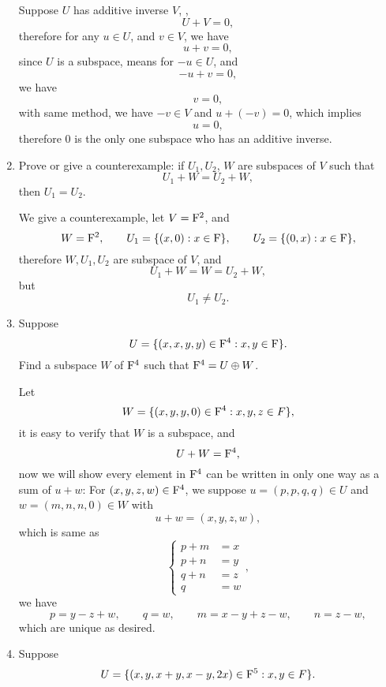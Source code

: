 \begin{enumerate}
\begin{solution}
            Suppose $U$ has additive inverse $V$, \ie, 
            \[ U + V = 0,\]
            therefore for any $u \in U$, and $v \in V$, we have 
            \[ u + v = 0,\]
            since $U$ is a subspace, means for $-u \in U$, and 
            \[ -u + v = 0,\]
            we have 
            \[ v= 0,\]
            with same method, we have $-v \in V$ and $u + (-v) = 0$, which implies 
            \[ u=0,\]
            therefore $0$ is the only one subspace who has an additive inverse.
        \end{solution}
    \item Prove or give a counterexample: if $U_1, U_2$, $W$ are subspaces of $V$ such that 
        \[ U_1 + W = U_2 + W ,\]
        then $U_1 = U_2$.
        \begin{solution}
            We give a counterexample, let $V = \mathrm{F}^2$, and
            \[ W = \mathrm{F}^2,\qquad U_1=\{(x,0):x\in \mathrm{F}\},\qquad U_2=\{(0,x):x\in \mathrm{F}\},\]
            therefore $W,U_1,U_2$ are subspace of $V$, and 
            \[ U_1 + W = W = U_2 + W ,\]
            but 
            \[ U_1 \neq U_2 .\]
        \end{solution}
    \item Suppose 
        \[ U = \{(x,x,y,y) \in \mathrm{F}^4: x, y \in \mathrm{F}\}.\]
        Find a subspace $W$ of $\mathrm{F}^4$ such that $\mathrm{F}^4=U \oplus W$.
        \begin{solution}
            Let 
            \[ W = \{(x,y,y,0) \in \mathrm{F}^4: x,y,z \in F\},\]
            it is easy to verify that $W$ is a subspace, and 
            \[ U + W = \mathrm{F}^4 ,\]
            now we will show every element in $\mathrm{F}^4$ can be written in only one way as a sum of $u+w$:
            For $(x,y,z,w) \in \mathrm{F}^4$, we suppose $u = (p, p, q,q) \in U$ and $w = (m, n,n,0) \in W$ with 
            \[ u + w = (x,y,z,w), \]
            which is same as 
            \[
                \begin{cases}
                    p + m &= x \\
                    p + n &= y \\
                    q + n &= z \\
                    q &= w
                \end{cases},
            \]
            we have
            \[ p = y-z+w, \qquad q=w, \qquad m = x-y+z-w, \qquad n=z - w,\]
            which are unique as desired.
        \end{solution} 
    \item Suppose 
        \[ U = \{(x,y,x+y,x-y,2x) \in \mathrm{F}^5: x,y \in F\}.\]

\end{enumerate}
